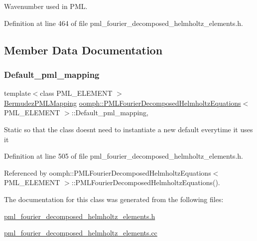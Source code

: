 Wavenumber used in P\+ML. 



Definition at line 464 of file pml\+\_\+fourier\+\_\+decomposed\+\_\+helmholtz\+\_\+elements.\+h.



\subsection{Member Data Documentation}
\mbox{\label{classoomph_1_1PMLFourierDecomposedHelmholtzEquations_af91ab5014bac6a9b90c3f2cb50b5ed60}} 
\subsubsection{\texorpdfstring{Default\+\_\+pml\+\_\+mapping}{Default\_pml\_mapping}}
{\footnotesize\ttfamily template$<$class P\+M\+L\+\_\+\+E\+L\+E\+M\+E\+NT $>$ \\
\hyperlink{classoomph_1_1BermudezPMLMapping}{Bermudez\+P\+M\+L\+Mapping} \hyperlink{classoomph_1_1PMLFourierDecomposedHelmholtzEquations}{oomph\+::\+P\+M\+L\+Fourier\+Decomposed\+Helmholtz\+Equations}$<$ P\+M\+L\+\_\+\+E\+L\+E\+M\+E\+NT $>$\+::Default\+\_\+pml\+\_\+mapping\hspace{0.3cm}{\ttfamily [static]}, {\ttfamily [protected]}}

Static so that the class doesn\textquotesingle{}t need to instantiate a new default everytime it uses it 

Definition at line 505 of file pml\+\_\+fourier\+\_\+decomposed\+\_\+helmholtz\+\_\+elements.\+h.



Referenced by oomph\+::\+P\+M\+L\+Fourier\+Decomposed\+Helmholtz\+Equations$<$ P\+M\+L\+\_\+\+E\+L\+E\+M\+E\+N\+T $>$\+::\+P\+M\+L\+Fourier\+Decomposed\+Helmholtz\+Equations().



The documentation for this class was generated from the following files\+:\begin{DoxyCompactItemize}
\item 
\hyperlink{pml__fourier__decomposed__helmholtz__elements_8h}{pml\+\_\+fourier\+\_\+decomposed\+\_\+helmholtz\+\_\+elements.\+h}\item 
\hyperlink{pml__fourier__decomposed__helmholtz__elements_8cc}{pml\+\_\+fourier\+\_\+decomposed\+\_\+helmholtz\+\_\+elements.\+cc}\end{DoxyCompactItemize}
